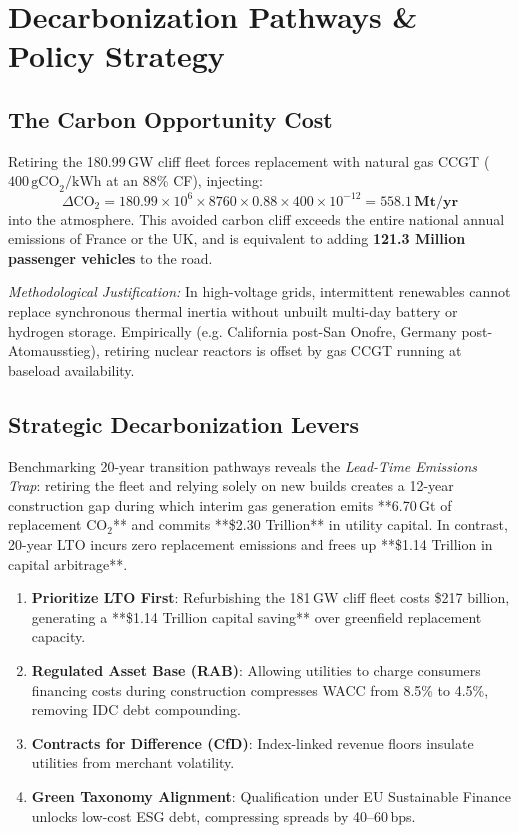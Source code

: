 \documentclass[10pt, twocolumn, a4paper]{article}
\begin{document}
\section{Decarbonization Pathways \& Policy Strategy}

\subsection{The Carbon Opportunity Cost}
Retiring the 180.99\,GW cliff fleet forces replacement with natural gas CCGT ($400\,\text{gCO}_2/\text{kWh}$ at an 88\% CF), injecting:
\begin{equation}
\Delta \text{CO}_2 = 180.99 \times 10^6 \times 8760 \times 0.88 \times 400 \times 10^{-12} = \mathbf{558.1\,\text{Mt/yr}}
\end{equation}
into the atmosphere. This avoided carbon cliff exceeds the entire national annual emissions of France or the UK, and is equivalent to adding \textbf{121.3 Million passenger vehicles} to the road. 

\textit{Methodological Justification:} In high-voltage grids, intermittent renewables cannot replace synchronous thermal inertia without unbuilt multi-day battery or hydrogen storage. Empirically (e.g. California post-San Onofre, Germany post-Atomausstieg), retiring nuclear reactors is offset by gas CCGT running at baseload availability.

\subsection{Strategic Decarbonization Levers}
Benchmarking 20-year transition pathways reveals the \textit{Lead-Time Emissions Trap}: retiring the fleet and relying solely on new builds creates a 12-year construction gap during which interim gas generation emits **6.70\,Gt of replacement CO$_2$** and commits **\$2.30 Trillion** in utility capital. In contrast, 20-year LTO incurs zero replacement emissions and frees up **\$1.14 Trillion in capital arbitrage**.
\begin{enumerate}
    \item \textbf{Prioritize LTO First}: Refurbishing the 181\,GW cliff fleet costs \$217 billion, generating a **\$1.14 Trillion capital saving** over greenfield replacement capacity.
    \item \textbf{Regulated Asset Base (RAB)}: Allowing utilities to charge consumers financing costs during construction compresses WACC from 8.5\% to 4.5\%, removing IDC debt compounding.
    \item \textbf{Contracts for Difference (CfD)}: Index-linked revenue floors insulate utilities from merchant volatility.
    \item \textbf{Green Taxonomy Alignment}: Qualification under EU Sustainable Finance unlocks low-cost ESG debt, compressing spreads by 40--60\,bps.
\end{enumerate}
\end{document}

